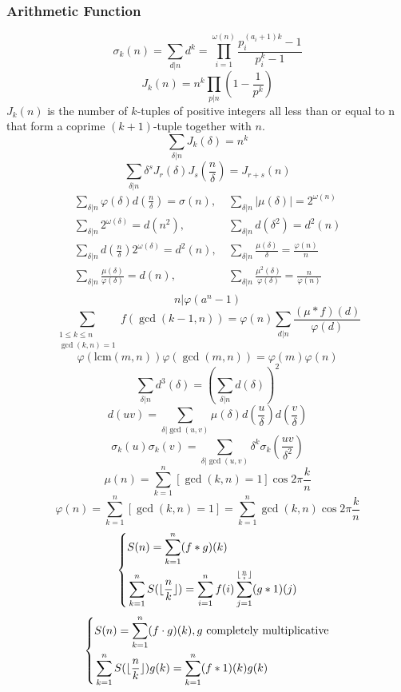 \def \bangle{ \atopwithdelims \langle \rangle}
\begin{small}
\subsubsection{Arithmetic Function}
\[ \sigma_k(n) = \sum_{d|n}d^k = \prod_{i=1}^{\omega(n)}\frac{p_i^{(a_i+1)k}-1}
{p_i^k-1} \]
\[ J_k(n) = n^k\prod_{p|n}(1-\frac{1}{p^k}) \]
$J_k(n)$ is the number of $k$-tuples of positive integers all less than or equal to n that form a coprime $(k + 1)$-tuple together with $n$.
\[ \sum_{\delta|n}J_k(\delta) = n^k \]
\[ \sum_{\delta|n}\delta^sJ_r(\delta)J_s(\frac{n}{\delta}) = J_{r+s}(n) \]
\begin{align*}
\sum_{\delta|n}\varphi(\delta)d(\frac{n}{\delta}) = \sigma(n),&\ \sum_{\delta|n}\left| \mu(\delta) \right| = 2^{\omega(n)} \\
\sum_{\delta|n}2^{\omega(\delta)} = d(n^2),&\ \sum_{\delta|n}d(\delta^2) = d^2(n) \\
\sum_{\delta|n}d(\frac{n}{\delta})2^{\omega(\delta)} = d^2(n),&\ \sum_{\delta|n}\frac{\mu(\delta)}{\delta} = \frac{\varphi(n)}{n} \\
\sum_{\delta|n}\frac{\mu(\delta)}{\varphi(\delta)} = d(n),&\ \sum_{\delta|n}\frac{\mu^2(\delta)}{\varphi(\delta)} = \frac{n}{\varphi(n)} \\
\end{align*}
\[ n|\varphi(a^n-1) \]
\[ \sum_{\substack{1 \leq k \leq n \\ \gcd(k, n) = 1}}f(\gcd(k-1, n)) = \varphi(n)
\sum_{d|n}\frac{(\mu*f)(d)}{\varphi(d)} \]
\[ \varphi(\mathrm{lcm}(m, n))\varphi(\gcd(m,n)) = \varphi(m)\varphi(n) \]
\[ \sum_{\delta|n}d^3(\delta) = (\sum_{\delta|n}d(\delta))^2 \]
\[ d(uv) = \sum_{\delta|\gcd(u, v)}\mu(\delta)d(\frac{u}{\delta})d(\frac{v}{\delta}) \]
\[ \sigma_k(u)\sigma_k(v) = \sum_{\delta|\gcd(u, v)}\delta^k\sigma_k(\frac{uv}{\delta^2}) \]
\[ \mu(n) = \sum_{k=1}^n[\gcd(k, n)=1]\cos{2\pi \frac{k}{n}} \]
\[ \varphi(n) = \sum_{k=1}^n[\gcd(k, n)=1] = \sum_{k=1}^n\gcd(k, n)\cos{2\pi \frac{k}{n}} \]
\[
\left\{
\begin{aligned}
&S(n) = \sum_{k=1}^n(f \ast g)(k) \\
&\sum_{k=1}^nS(\lfloor {n \over k} \rfloor) = \sum_{i=1}^nf(i)\sum_{j=1}^{\lfloor{n \over i}\rfloor}(g \ast 1)(j)
\end{aligned}
\right.
\]
\[
\left\{
\begin{aligned}
&S(n) = \sum_{k=1}^n(f \cdot g)(k), g \text{ completely multiplicative} \\
&\sum_{k=1}^nS(\lfloor {n \over k} \rfloor)g(k) = \sum_{k=1}^n(f \ast 1)(k)g(k)
\end{aligned}
\right.
\]

\end{small}

